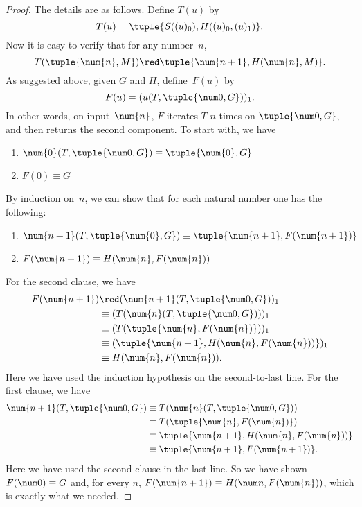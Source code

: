 \documentclass[../../../include/open-logic-section]{subfiles}
\begin{document}
\begin{proof}
The details are as follows. Define $T(u)$ by
\[
T(u) = \tuple{S((u)_0), H((u)_0,(u)_1)}.
\]
Now it is easy to verify that for any number~$n$,
\[
T(\tuple{\num{n}, M}) \red \tuple{\num{n+1}, H(\num{n}, M)}.
\]
As suggested above, given $G$ and $H$, define~$F(u)$ by
\[
F(u) = (u(T,\tuple{\num 0, G}))_1.
\]
In other words, on input~$\num{n}$, $F$ iterates $T$ $n$ times on
$\tuple{\num 0, G}$, and then returns the second component. To start
with, we have
\begin{enumerate}
\item $\num{0} (T, \tuple{\num 0, G}) \equiv \tuple{\num{0}, G}$
\item $F(\num{0}) \equiv G$
\end{enumerate}
By induction on~$n$, we can show that for each natural number one has
the following:
\begin{enumerate}
\item $\num{n+1}(T, \tuple{\num{0}, G}) \equiv \tuple{\num{n+1}, F(\num{n+1})}$
\item $F(\num{n+1}) \equiv H(\num{n}, F(\num{n}))$
\end{enumerate}
For the second clause, we have
\begin{align*}
F(\num{n+1}) & \red (\num{n+1}(T, \tuple{\num 0, G}))_1 \\
& \equiv (T(\num{n} (T, \tuple{\num 0, G})))_1 \\
& \equiv (T(\tuple{\num{n}, F(\num{n})}))_1 \\
& \equiv (\tuple{\num{n+1}, H(\num{n}, F(\num{n}))})_1 \\
& \equiv H(\num{n}, F(\num{n})).
\end{align*}
Here we have used the induction hypothesis on the second-to-last
line. For the first clause, we have
\begin{align*}
\num{n+1} (T, \tuple{\num 0, G}) &
\equiv T(\num{n} (T, \tuple{\num 0, G})) \\
& \equiv T( \tuple{\num{n}, F(\num{n})}) \\
& \equiv \tuple{\num{n+1}, H(\num{n}, F(\num{n}))} \\
& \equiv \tuple{\num{n+1}, F(\num{n+1})}.
\end{align*}
Here we have used the second clause in the last line. So we have shown
$F(\num 0) \equiv G$ and, for every $n$, $F(\num {n+1}) \equiv H(\num
n, F(\num{n}))$, which is exactly what we needed.
\end{proof}
\end{document}
